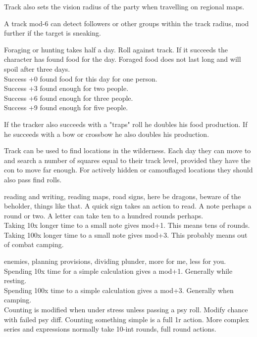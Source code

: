 Track also sets the vision radius of the party when travelling on regional maps.

A track mod-6 can detect followers or other groups within the track radius, mod further if the target is sneaking.

Foraging or hunting takes half a day. Roll against track. If it succeeds the character has found food for the day. Foraged food does not last long and will spoil after three days. \\
Success +0 found food for this day for one person. \\
Success +3 found enough for two people. \\
Success +6 found enough for three people. \\
Success +9 found enough for five people.

If the tracker also succeeds with a "traps" roll he doubles his food production. If he succeeds with a bow or crossbow he also doubles his production.

Track can be used to find locations in the wilderness. Each day they can move to and search a number of squares equal to their track level, provided they have the con to move far enough. For actively hidden or camouflaged locations they should also pass find rolls.


 reading and writing, reading maps, road signs, here be dragons, beware of the beholder, things like that. A quick sign takes an action to read. A note perhaps a round or two. A letter can take ten to a hundred rounds perhaps. \\
Taking 10x longer time to a small note gives mod+1. This means tens of rounds. \\
Taking 100x longer time to a small note gives mod+3. This probably means out of combat camping.


 enemies, planning provisions, dividing plunder, more for me, less for you. \\
Spending 10x time for a simple calculation gives a mod+1. Generally while resting.\\
Spending 100x time to a simple calculation gives a mod+3. Generally when camping.\\

Counting is modified when under stress unless passing a psy roll. Modify chance with failed psy diff. Counting something simple is a full 1r action. More complex series and expressions normally take 10-int rounds, full round actions.

